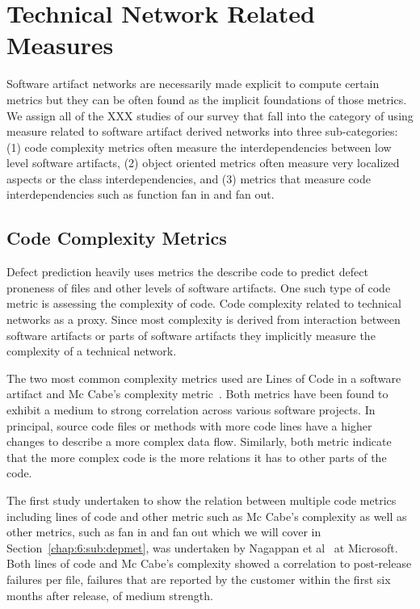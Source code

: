 \section{Technical Network Related Measures}
\label{chap:6:measure}
Software artifact networks are necessarily made explicit to compute certain metrics but they can be often found as the implicit foundations of those metrics.
We assign all of the XXX studies of our survey that fall into the category of using measure related to software artifact derived networks into three sub-categories:
(1) code complexity metrics often measure the interdependencies between low level software artifacts,
(2) object oriented metrics often measure very localized aspects or the class interdependencies,
and (3) metrics that measure code interdependencies such as function fan in and fan out.

\subsection{Code Complexity Metrics}
Defect prediction heavily uses metrics the describe code to predict defect proneness of files and other levels of software artifacts.
One such type of code metric is assessing the complexity of code.
Code complexity related to technical networks as a proxy.
Since most complexity is derived from interaction between software artifacts or parts of software artifacts they implicitly measure the complexity of a technical network.

The two most common complexity metrics used are Lines of Code in a software artifact and Mc Cabe's complexity metric~\cite{mccabe:ieee:1976}.
Both metrics have been found to exhibit a medium to strong correlation across various software projects.
In principal, source code files or methods with more code lines have a higher changes to describe a more complex data flow.
Similarly, both metric indicate that the more complex code is the more relations it has to other parts of the code.

The first study undertaken to show the relation between multiple code metrics including lines of code and other metric such as Mc Cabe's complexity as well as other metrics, such as fan in and fan out which we will cover in Section~\ref{chap:6:sub:depmet}, was undertaken by Nagappan et al~\cite{nagappan:icse:2006} at Microsoft.
Both lines of code and Mc Cabe's complexity showed a correlation to post-release failures per file, failures that are reported by the customer within the first six months after release, of medium strength.

